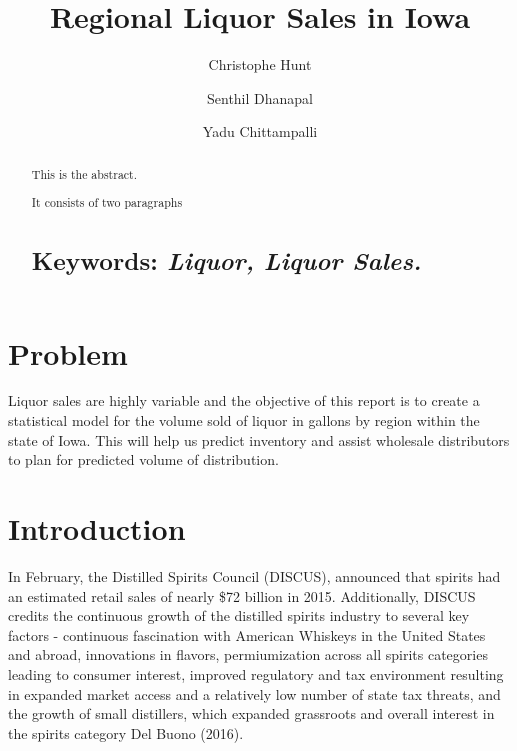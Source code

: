 \documentclass[]{elsarticle} %
\begin{document}
\begin{frontmatter}

  \title{Regional Liquor Sales in Iowa}
    \author[CUNY School of Professional Studies]{Christophe Hunt}
    \author[CUNY School of Professional Studies]{Senthil Dhanapal}
  
    \author[CUNY School of Professional Studies]{Yadu Chittampalli}
  
      \address[CUNY School of Professional Studies]{CUNY School of Professional Studies, Data Analytics, New York, NY}
  
  \begin{abstract}
  This is the abstract.
  
  It consists of two paragraphs
  
  \section{\texorpdfstring{Keywords: \emph{Liquor, Liquor
  Sales.}}{Keywords: Liquor, Liquor Sales.}}\label{keywords-liquor-liquor-sales.}
  \end{abstract}
  
 \end{frontmatter}

\section{Problem}\label{problem}

Liquor sales are highly variable and the objective of this report is to
create a statistical model for the volume sold of liquor in gallons by
region within the state of Iowa. This will help us predict inventory and
assist wholesale distributors to plan for predicted volume of
distribution.

\section{Introduction}\label{introduction}

In February, the Distilled Spirits Council (DISCUS), announced that
spirits had an estimated retail sales of nearly \$72 billion in 2015.
Additionally, DISCUS credits the continuous growth of the distilled
spirits industry to several key factors - continuous fascination with
American Whiskeys in the United States and abroad, innovations in
flavors, permiumization across all spirits categories leading to
consumer interest, improved regulatory and tax environment resulting in
expanded market access and a relatively low number of state tax threats,
and the growth of small distillers, which expanded grassroots and
overall interest in the spirits category Del Buono (2016).
\end{document}
